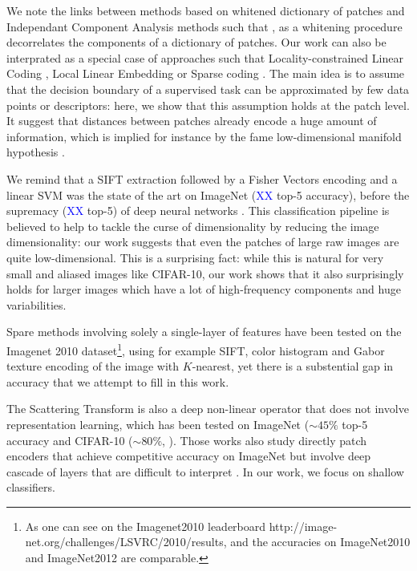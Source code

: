 \documentclass{article}
\newcommand{\Edouard}[1]{\textcolor{blue}{#1}}
\begin{document}
{We  note the links between methods based on whitened dictionary of patches and Independant Component Analysis methods such that \citep{ngiam2010tiled}, as a whitening procedure decorrelates the components of a dictionary of patches. Our work can also be interprated as a special case of approaches such that Locality-constrained Linear Coding \citep{russakovsky2015imagenet,yu2010improved}, Local Linear Embedding \citep{Roweis2323} or Sparse coding \citep{bo2013multipath}. The main idea is to assume that the  decision boundary of a supervised task can be approximated by few data points or descriptors: here, we show that this assumption holds at the patch level. It suggest that distances between patches already encode a huge amount of information, which is implied for instance by the fame low-dimensional manifold hypothesis 
\citep{fefferman2016testing}. 

We remind that a SIFT extraction \cite{lowe2004distinctive} followed by a Fisher Vectors  encoding \citep{sanchez2013image} and a linear SVM was the state of the art on ImageNet (\Edouard{XX} top-5 accuracy), before the supremacy (\Edouard{XX} top-5) of deep neural networks \citet{krizhevsky2012imagenet}. This classification pipeline is believed to help to tackle the curse of dimensionality by reducing the image dimensionality: our work  suggests that even the patches of large raw images are quite low-dimensional. This is a surprising fact: while this is natural for very small and aliased  images like CIFAR-10, our work shows that it also surprisingly holds for larger images which have a lot of high-frequency components and huge variabilities.

Spare methods involving solely a single-layer of  features  have been tested on the Imagenet 2010 dataset\footnote{ As one can see on the Imagenet2010 leaderboard http://image-net.org/challenges/LSVRC/2010/results, and the accuracies on ImageNet2010 and ImageNet2012 are comparable.}, using for example SIFT, color histogram and Gabor texture encoding of the image with $K$-nearest, yet there is a substential gap in accuracy that we attempt to fill in this work.

The Scattering Transform \citep{mallat2012group} is also a deep non-linear operator that does not involve representation learning, which has been tested on ImageNet ($\sim 45\%$ top-5 accuracy \citep{zarka2019deep} and  CIFAR-10 ($\sim 80 \%$, \citep{Oyallon_2015_CVPR}).
Those works also study directly patch encoders that achieve competitive accuracy on ImageNet but involve deep cascade of layers that are difficult to interpret \citep{oyallon2017scaling,zarka2019deep,brendel2019approximating}. In our work, we focus on shallow classifiers.

}
\end{document}
